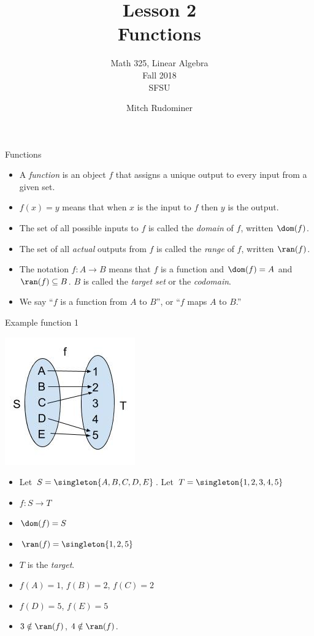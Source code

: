 \documentclass{beamer}
\title{Lesson 2 \\ Functions}
\subtitle{Math 325, Linear Algebra \\ Fall 2018 \\ SFSU}
\author{Mitch Rudominer}
\date{}
\begin{document}
\begin{frame}
  \titlepage
\end{frame}


\begin{frame}{Functions}

  \begin{itemize}
  \item  A \emph{function} is an object $f$ that assigns a unique output
  to every input from a given set.
  \item $f(x) = y$ means that when $x$ is the input to $f$ then $y$ is the output.
  \item The set of all possible inputs to $f$ is called the \emph{domain} of $f$,
  written $\dom(f)$.
  \item The set of all \emph{actual} outputs from $f$ is called the \emph{range} of $f$,
  written $\ran(f)$.
  \item The notation $f:A \to B$ means that $f$ is a function and
  $\dom(f)=A$ and $\ran(f)\subseteq B$. $B$ is called the \emph{target set}
  or the \emph{codomain}.
  \item We say ``$f$ is a function from $A$ to $B$'', or ``$f$ maps $A$ to $B$.''
  \end{itemize}


\end{frame}

\begin{frame}{Example function 1}
\begin{center}
\includegraphics[scale=0.25]{function1}
\end{center}

\begin{itemize}
\item Let $S=\singleton{A,B,C,D,E}$. Let $T=\singleton{1,2,3,4,5}$
\item $f:S\to T$
\item $\dom(f) = S$
\item $\ran(f) = \singleton{1,2,5}$
\item $T$ is the \emph{target}.
\item $f(A) = 1$, $f(B) = 2$, $f(C)=2$
\item $f(D) = 5$, $f(E) = 5$
\item $3 \notin \ran(f)$, $4\notin\ran(f)$.
\end{itemize}
\end{frame}
\end{document}
